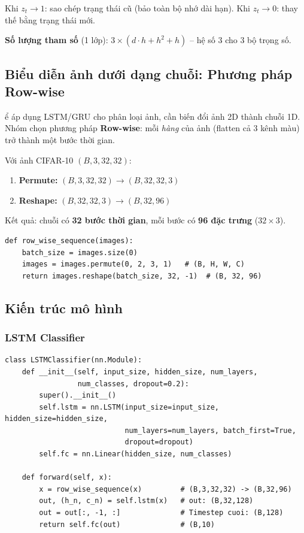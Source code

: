 \documentclass[a4paper]{article}
\theoremstyle{definition}
\begin{document}
Khi $z_t \to 1$: sao chép trạng thái cũ (bảo toàn bộ nhớ dài hạn). Khi $z_t \to 0$: thay thế bằng trạng thái mới.

\textbf{Số lượng tham số} (1 lớp): $3 \times (d \cdot h + h^2 + h)$ -- hệ số 3 cho 3 bộ trọng số.

\subsection{Biểu diễn ảnh dưới dạng chuỗi: Phương pháp Row-wise}

\DJ ể áp dụng LSTM/GRU cho phân loại ảnh, cần biến đổi ảnh 2D thành chuỗi 1D. Nhóm chọn phương pháp \textbf{Row-wise}: mỗi \textit{hàng} của ảnh (flatten cả 3 kênh màu) trở thành một bước thời gian.

Với ảnh CIFAR-10 $(B, 3, 32, 32)$:
\begin{enumerate}
	\item \textbf{Permute:} $(B, 3, 32, 32) \to (B, 32, 32, 3)$
	\item \textbf{Reshape:} $(B, 32, 32, 3) \to (B, 32, 96)$
\end{enumerate}

Kết quả: chuỗi có \textbf{32 bước thời gian}, mỗi bước có \textbf{96 đặc trưng} ($32 \times 3$).

\begin{verbatim}
def row_wise_sequence(images):
    batch_size = images.size(0)
    images = images.permute(0, 2, 3, 1)   # (B, H, W, C)
    return images.reshape(batch_size, 32, -1)  # (B, 32, 96)
\end{verbatim}

\subsection{Kiến trúc mô hình}

\subsubsection{LSTM Classifier}
\begin{verbatim}
class LSTMClassifier(nn.Module):
    def __init__(self, input_size, hidden_size, num_layers,
                 num_classes, dropout=0.2):
        super().__init__()
        self.lstm = nn.LSTM(input_size=input_size, hidden_size=hidden_size,
                            num_layers=num_layers, batch_first=True,
                            dropout=dropout)
        self.fc = nn.Linear(hidden_size, num_classes)

    def forward(self, x):
        x = row_wise_sequence(x)         # (B,3,32,32) -> (B,32,96)
        out, (h_n, c_n) = self.lstm(x)   # out: (B,32,128)
        out = out[:, -1, :]              # Timestep cuoi: (B,128)
        return self.fc(out)              # (B,10)
\end{verbatim}
\end{document}
